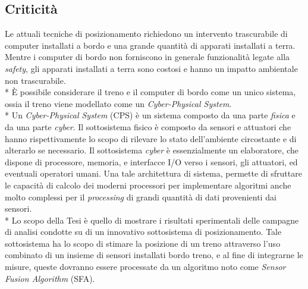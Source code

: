 \subsection{Criticit\`a}
Le attuali tecniche di posizionamento richiedono un intervento trascurabile di computer installati a bordo e una grande quantit\`a di apparati installati a terra. Mentre i computer di bordo non forniscono in generale funzionalit\`a legate alla \emph{safety}, gli apparati installati a terra sono costosi e hanno un impatto ambientale non trascurabile.\\*
\`E possibile considerare il treno e il computer di bordo come un unico sistema, ossia il treno viene modellato come un \emph{Cyber-Physical System}.\\*
Un \emph{Cyber-Physical System} (CPS) \`e un sistema composto da una parte \emph{fisica} e da una parte \emph{cyber}. Il sottosistema fisico \`e composto da sensori e attuatori che hanno rispettivamente lo scopo di rilevare lo stato dell'ambiente circostante e di alterarlo se necessario. Il sottosistema \emph{cyber} \`e essenzialmente un elaboratore, che dispone di processore, memoria, e interfacce I/O verso i sensori, gli attuatori, ed eventuali operatori  umani. \cite{cps}\cite{cecca} Una tale architettura di sistema, permette di sfruttare le capacit\`a di calcolo dei moderni processori per implementare algoritmi anche molto complessi per il \emph{processing} di grandi quantit\`a di dati provenienti dai sensori.\\*
Lo scopo della Tesi \`e quello di mostrare i risultati sperimentali delle campagne di analisi condotte su di un innovativo sottosistema di posizionamento. Tale sottosistema ha lo scopo di stimare la posizione di un treno attraverso l'uso combinato di un insieme di sensori installati bordo treno, e al fine di integrarne le misure, queste dovranno essere processate da un algoritmo noto come \emph{Sensor Fusion Algorithm} (SFA).\cite{datafuse} \cite{sfarailway} 